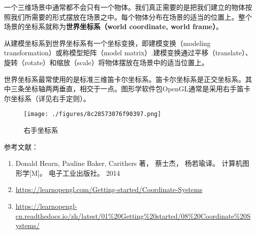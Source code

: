 

一个三维场景中通常都不会只有一个物体。我们真正需要的是把我们建立的物体按照我们所需要的形式摆放在场景之中。每个物体分布在场景的适当的位置上。整个场景的坐标系就称为\textbf{世界坐标系（world coordinate, world frame）}。

从建模坐标系到世界坐标系有一个坐标变换，即建模变换（modeling transformation）或称模型矩阵（model matrix）.建模变换通过平移（translate）、旋转（rotate）和缩放（scale）将物体摆放在场景中的适当位置上。

世界坐标系最常使用的是标准三维笛卡尔坐标系。笛卡尔坐标系是正交坐标系。其中三条坐标轴两两垂直，相交于一点。图形学软件包OpenGL通常是采用右手笛卡尔坐标系（详见右手定则）。


\begin{figure}[ht]
\centering
\texttt{[image: ./figures/8c28573076f90397.png]}
\caption{右手坐标系} \label{fig_Worcod_1}
\end{figure}


参考文献：
\begin{enumerate}
\item Donald Hearn, Pauline Baker, Carithers 著， 蔡士杰， 杨若瑜译。 计算机图形学[M]。 电子工业出版社。 2014
\item \href{https://learnopengl.com/Getting-started/Coordinate-Systems}{https://learnopengl.com/Getting-started/Coordinate-Systems}
\item \href{https://learnopengl-cn.readthedocs.io/zh/latest/01\%20Getting\%20started/08\%20Coordinate\%20Systems/}{https://learnopengl-cn.readthedocs.io/zh/latest/01\%20Getting\%20started/08\%20Coordinate\%20Systems/}
\end{enumerate}